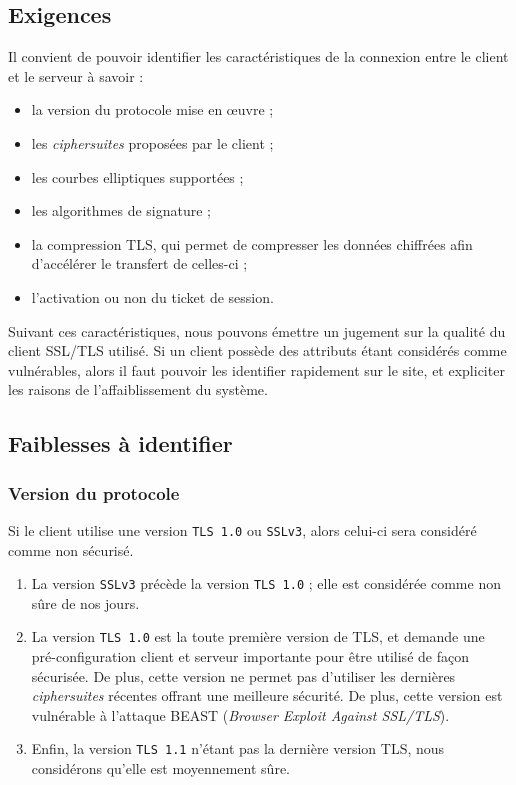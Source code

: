 \subsection{Exigences}
Il convient de pouvoir identifier les caractéristiques de la connexion entre le client et le serveur à savoir :
\begin{itemize}
\item la version du protocole mise en œuvre ;
\item les \textit{ciphersuites} proposées par le client ;
\item les courbes elliptiques supportées ;
\item les algorithmes de signature ;
\item la compression TLS, qui permet de compresser les données chiffrées afin d'accélérer le transfert de celles-ci ;
\item l'activation ou non du ticket de session.\\
\end{itemize}

Suivant ces caractéristiques, nous pouvons émettre un jugement sur la qualité du client SSL/TLS utilisé. Si un client possède des attributs étant considérés comme vulnérables, alors il faut pouvoir les identifier rapidement sur le site, et expliciter les raisons de l'affaiblissement du système.  


\subsection{Faiblesses à identifier}
\subsubsection{Version du protocole}
Si le client utilise une version \texttt{TLS 1.0} ou \texttt{SSLv3}, alors celui-ci sera considéré comme non sécurisé.\\

\begin{enumerate}
\item La version \texttt{SSLv3} précède la version \texttt{TLS 1.0} ; elle est considérée comme non sûre de nos jours. 

 
\item La version \texttt{TLS 1.0} est la toute première version de TLS, et demande une pré-configuration client et serveur importante pour être utilisé de façon sécurisée. De plus, cette version ne permet pas d'utiliser les dernières \textit{ciphersuites} récentes offrant une meilleure sécurité. De plus, cette version est vulnérable à l'attaque BEAST	(\textit{Browser Exploit Against SSL/TLS}).

\item Enfin, la version \texttt{TLS 1.1}  n'étant pas la dernière version TLS, nous considérons qu'elle est moyennement sûre.\\
\end{enumerate}



